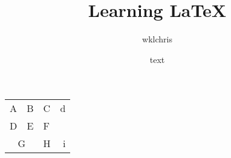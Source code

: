 \documentclass[a4paper]{article}
\title{Learning LaTeX}
\author{wklchris}
\date{text}
\begin{document}
\begin{center}
     \begin{tabular}[c]{|l|c||p{3em}
     r@{-}} \hline\hline
     A & B & C & d\\D & E & F &
    \\
     \cline{1-2}
     \multicolumn{2}{|c|}{G}&H&i\\
     \hline
     \end{tabular}
     \end{center}
\end{document}

